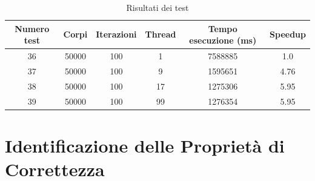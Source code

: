 \documentclass[12pt,a4paper,openright,twoside]{book}
\begin{document}
\begin{center}
	\begin{table}
		\begin{tabular}{ |c|c|c|c|c|c| } 
			\hline
				Numero test & Corpi & Iterazioni & Thread & Tempo esecuzione (ms) & Speedup \\
			\hline
		   36 & 50000 & 100 & 1 & 7588885 & 1.0 \\ 
			\hline
		   37 & 50000 & 100 & 9 & 1595651 & 4.76 \\ 
			\hline
		   38 & 50000 & 100 & 17 & 1275306 & 5.95 \\ 
			\hline
		   39 & 50000 & 100 & 99 & 1276354 & 5.95 \\ 
			\hline
		\end{tabular}
		\label{tab:table2}
		\caption{Risultati dei test}
	\end{table}
\end{center}

\chapter{Identificazione delle Proprietà di Correttezza} %
\label{chap:Identificazione delle Proprietà di Correttezza}
\end{document}
